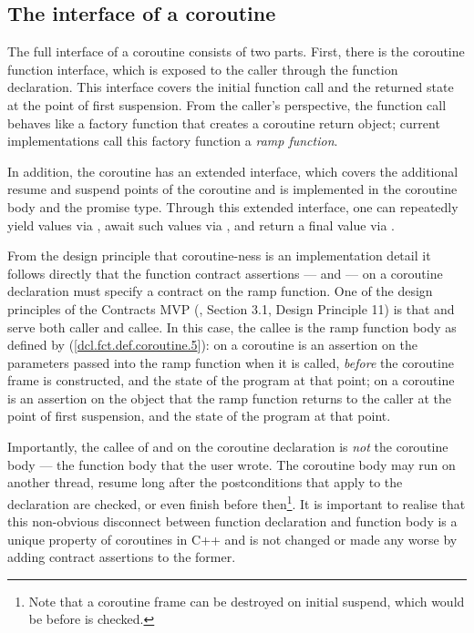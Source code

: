 \subsection{The interface of a coroutine}

The full interface of a coroutine consists of two parts. First, there is the coroutine function interface, which is exposed to the caller through the function declaration. This interface covers the initial function call and the returned state at the point of first suspension. From the caller's perspective, the function call behaves like a factory function that creates a coroutine return object; current implementations call this factory function a \emph{ramp function}.

In addition, the coroutine has an extended interface, which covers the additional resume and suspend points of the coroutine and is implemented in the coroutine body and the promise type.  Through this extended interface, one can repeatedly yield values via , await such values via , and return a final value via .

From the design principle that coroutine-ness is an implementation detail it follows directly that the function contract assertions ---  and  --- on a coroutine declaration must specify a contract on the ramp function. One of the design principles of the Contracts MVP (\cite{P2900R8}, Section 3.1, Design Principle 11) is that  and  serve both caller and callee. In this case, the callee is the ramp function body as defined by ([\href{https://eel.is/c++draft/dcl.fct.def.coroutine#5}{dcl.fct.def.coroutine.5}]):  on a coroutine is an assertion on the parameters passed into the ramp function when it is called, \emph{before} the coroutine frame is constructed, and the state of the program at that point;  on a coroutine is an assertion on the object that the ramp function returns to the caller at the point of first suspension, and the state of the program at that point.

Importantly, the callee of  and  on the coroutine declaration is \emph{not} the coroutine body --- the function body that the user wrote. The coroutine body may run on another thread, resume long after the postconditions that apply to the declaration are checked, or even finish before then\footnote{Note that a coroutine frame can be destroyed on initial suspend, which would be before  is checked.}. It is important to realise that this non-obvious disconnect between function declaration and function body is a unique property of coroutines in C++ and is not changed or made any worse by adding contract assertions to the former.

